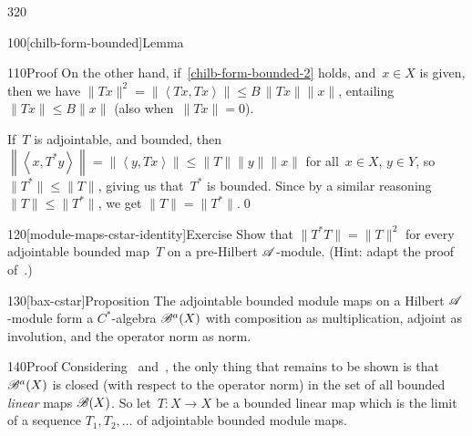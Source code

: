 \begin{parsec}{320}
\begin{point}{100}[chilb-form-bounded]{Lemma}
\begin{point}{110}{Proof}
On the other hand,
if~\ref{chilb-form-bounded-2} holds,
and~$x\in X$ is given,
then we have $\|Tx\|^2=\left\|\left<Tx,Tx\right>\right\|
\leq B \,\|Tx\|\|x\|$,
entailing $\|Tx\|\leq B\|x\|$
(also when~$\|Tx\|=0$).

If~$T$ is adjointable, and bounded,
then~$\left\|\left<x,T^*y\right>\right\|=\left\|\left<y,Tx\right>\right\|
\leq \|T\|\|y\|\|x\|$ for all~$x\in X$, $y\in Y$,
so~$\|T^*\|\leq \|T\|$,
giving us that~$T^*$ is bounded.
Since by a similar reasoning $\|T\|\leq \|T^*\|$,
we get $\|T\|=\|T^*\|$.\qed
\end{point}
\end{point}
\begin{point}{120}[module-maps-cstar-identity]{Exercise}%
Show that $\|T^*T\|=\|T\|^2$
for every adjointable bounded map~$T$ on a pre-Hilbert $\mathscr{A}$-module.
(Hint: adapt the proof of~.)
\end{point}
\begin{point}{130}[bax-cstar]{Proposition}%
The adjointable bounded module maps
on a Hilbert $\mathscr{A}$-module
form a $C^*$-algebra%
$\mathscr{B}^a(X)$
with composition as multiplication,
adjoint as involution,
and the operator norm as norm.
\begin{point}{140}{Proof}%
Considering~
and~,
the only thing that remains to be shown is that~$\mathscr{B}^a(X)$
is closed (with respect to the operator norm)
in the set of all bounded \emph{linear} maps $\mathscr{B}(X)$.
So let~$T\colon X\to X$ be a bounded linear map
which is the limit of a sequence $T_1,T_2,\dotsc$
of adjointable bounded module maps.


\end{point}
\end{point}
\end{parsec}
